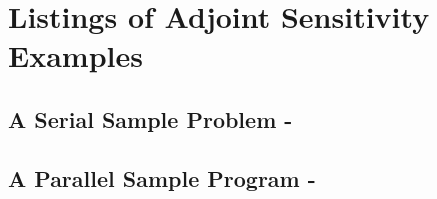 \section{Listings of {\cvodes} Adjoint Sensitivity Examples}\label{s:adj_codes}

\subsection{A Serial Sample Problem - }\label{ss:cvadx}
{\small}

\newpage
\subsection{A Parallel Sample Program - }\label{ss:pvanx}
{\small}
